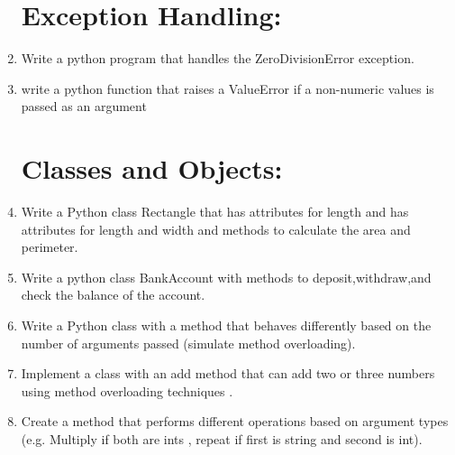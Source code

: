 \documentclass[a4paper,11pt]{article}
\theoremstyle{mytheor}
\begin{document}
\begin{enumerate}
\section{Exception Handling:}
	\item Write a python program that handles the ZeroDivisionError exception.
	\item write a python function that raises a ValueError if a non-numeric values is passed as an argument
	
\section{Classes and Objects:}
	\item Write a Python class Rectangle that has attributes for length and has attributes for length and width and methods to calculate the area and perimeter.
	\item Write a python class BankAccount with methods to deposit,withdraw,and check the balance of the account.
	\item Write a Python class with a method that behaves differently based on the number of arguments passed (simulate method overloading).
	
	\item Implement a class with an add method that can add two or three numbers using method overloading techniques .
	
	\item Create a method that performs different operations based on argument types (e.g. Multiply if both are ints , repeat if first is string and second is int).
\end{enumerate}
\end{document}
